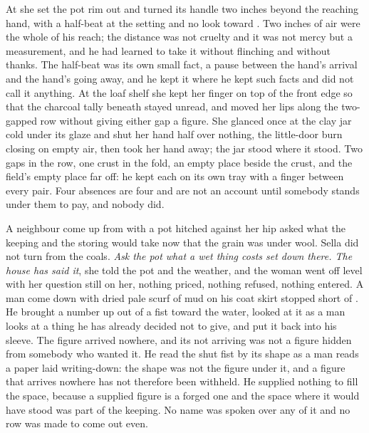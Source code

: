At  she set the pot rim out and turned its handle two inches beyond the reaching hand, with a half-beat at the setting and no look toward . Two inches of air were the whole of his reach; the distance was not cruelty and it was not mercy but a measurement, and he had learned to take it without flinching and without thanks. The half-beat was its own small fact, a pause between the hand's arrival and the hand's going away, and he kept it where he kept such facts and did not call it anything. At the loaf shelf she kept her finger on top of the front edge so that the charcoal tally beneath stayed unread, and moved her lips along the two-gapped row without giving either gap a figure. She glanced once at the clay jar cold under its glaze and shut her hand half over nothing, the little-door burn closing on empty air, then took her hand away; the jar stood where it stood. Two gaps in the row, one crust in the fold, an empty place beside the crust, and the field's empty place far off: he kept each on its own tray with a finger between every pair. Four absences are four and are not an account until somebody stands under them to pay, and nobody did.

A neighbour come up from  with a pot hitched against her hip asked what the keeping and the storing would take now that the grain was under wool. Sella did not turn from the coals. \emph{Ask the pot what a wet thing costs set down there. The house has said it}, she told the pot and the weather, and the woman went off level with her question still on her, nothing priced, nothing refused, nothing entered. A man come down  with dried pale scurf of mud on his coat skirt stopped short of . He brought a number up out of a fist toward the water, looked at it as a man looks at a thing he has already decided not to give, and put it back into his sleeve. The figure arrived nowhere, and its not arriving was not a figure hidden from somebody who wanted it. He read the shut fist by its shape as a man reads a paper laid writing-down: the shape was not the figure under it, and a figure that arrives nowhere has not therefore been withheld. He supplied nothing to fill the space, because a supplied figure is a forged one and the space where it would have stood was part of the keeping. No name was spoken over any of it and no row was made to come out even.

\scenebreak

